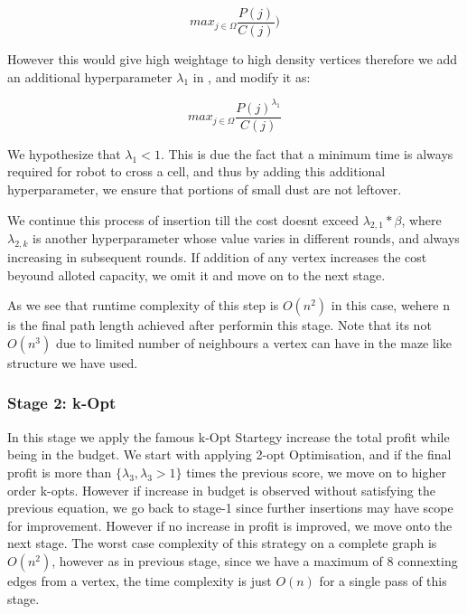 \documentclass{article}
\begin{document}
\begin{equation} \label{eq3}
    max_{j \in \Omega} \frac{P(j)}{C(j)} )
\end{equation}

However this would give high weightage to high density vertices therefore we add an additional hyperparameter $\lambda_1$ in ,
and modify it as:

\begin{equation} \label{eq4}
    max_{j \in \Omega}  \frac{P(j)^{\lambda_{1}}}{C(j)} 
\end{equation}

We hypothesize that $\lambda_{1} < 1$. This is due the fact that a minimum time is always required for robot to cross a cell, and thus by adding this additional hyperparameter,
we ensure that portions of small dust are not leftover.

We continue this process of insertion till the cost doesnt exceed $\lambda_{2,1} * \beta$, where $\lambda_{2,k}$ is another hyperparameter whose value varies in different rounds, and always increasing in subsequent rounds. 
If addition of any vertex increases the cost beyound alloted capacity, we omit it and move on to the next stage.

As we see that runtime complexity of this step is $O(n^2)$ in this case, wehere n is the final path length achieved after performin this stage. Note that its not $O(n^3)$ due to limited number of neighbours a vertex can have in the maze like structure we have used.


\subsubsection{Stage 2: k-Opt}

In this stage we apply the famous k-Opt Startegy \cite{c1} increase the total profit while being in the budget. 
We start with applying 2-opt Optimisation, and if the final profit is more than $\{ \lambda_{3} , \lambda_{3} > 1 \}$ times the previous score, we move on to higher order k-opts. 
However if increase in budget is observed without satisfying the previous equation, we go back to stage-1 since further insertions may have scope for improvement. 
However if no increase in profit is improved, we move onto the next stage. The worst case complexity of this strategy on a complete graph is $O(n^2)$, however as in previous stage, since we have a maximum of 8 connexting edges from a vertex, the time complexity is just $O(n)$ for a single pass of this stage.
\end{document}
